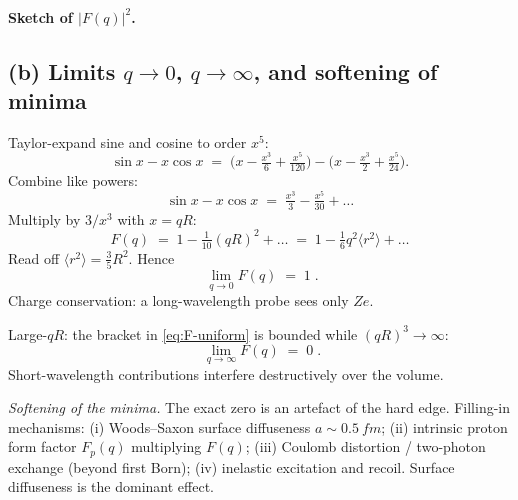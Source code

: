 \documentclass[11pt]{article}
\begin{document}
\paragraph{Sketch of $|F(q)|^{2}$.}
\begin{center}
\end{center}

\subsection*{(b) Limits $q\to 0$, $q\to\infty$, and softening of minima}

Taylor-expand sine and cosine to order $x^{5}$:
\[
\sin x-x\cos x\;=\;\bigl(x-\tfrac{x^{3}}{6}+\tfrac{x^{5}}{120}\bigr)-\bigl(x-\tfrac{x^{3}}{2}+\tfrac{x^{5}}{24}\bigr).
\]
Combine like powers:
\[
\sin x-x\cos x\;=\;\tfrac{x^{3}}{3}-\tfrac{x^{5}}{30}+\dots
\]
Multiply by $3/x^{3}$ with $x=qR$:
\[
F(q)\;=\;1-\tfrac{1}{10}(qR)^{2}+\dots\;=\;1-\tfrac{1}{6}q^{2}\langle r^{2}\rangle+\dots
\]
Read off $\langle r^{2}\rangle=\tfrac{3}{5}R^{2}$. Hence
\begin{equation}
\boxed{\;\lim_{q\to 0}F(q)\;=\;1\;.}
\label{eq:F-q0}
\end{equation}
Charge conservation: a long-wavelength probe sees only $Ze$.

Large-$qR$: the bracket in \eqref{eq:F-uniform} is bounded while $(qR)^{3}\to\infty$:
\begin{equation}
\boxed{\;\lim_{q\to\infty}F(q)\;=\;0\;.}
\label{eq:F-qinf}
\end{equation}
Short-wavelength contributions interfere destructively over the volume.

\emph{Softening of the minima.} The exact zero is an artefact of the hard edge. Filling-in mechanisms: (i) Woods--Saxon surface diffuseness $a\sim\SI{0.5}{fm}$; (ii) intrinsic proton form factor $F_{p}(q)$ multiplying $F(q)$; (iii) Coulomb distortion / two-photon exchange (beyond first Born); (iv) inelastic excitation and recoil. Surface diffuseness is the dominant effect.
\end{document}
